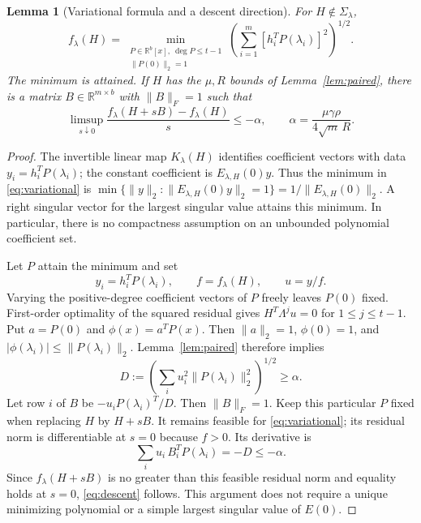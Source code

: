 \documentclass[11pt]{article}
\numberwithin{equation}{section}
\newtheorem{lemma}[theorem]{Lemma}
\theoremstyle{definition}
\newcommand{\R}{\mathbb R}
\newcommand{\nn}[1]{\lVert #1\rVert}
\begin{document}
\begin{lemma}[Variational formula and a descent direction]\label{lem:descent}
For $H\notin\Sigma_\lambda$,
\begin{equation}\label{eq:variational}
f_\lambda(H)=
\min_{\substack{P\in\R^b[x],\ \deg P\le t-1\\\nn{P(0)}_2=1}}
\left(\sum_{i=1}^m[h_i^TP(\lambda_i)]^2\right)^{1/2}.
\end{equation}
The minimum is attained. If $H$ has the $\mu,R$ bounds of Lemma~\ref{lem:paired}, there is a matrix $B\in\R^{m\times b}$ with $\nn B_F=1$ such that
\begin{equation}\label{eq:descent}
\limsup_{s\downarrow0}\frac{f_\lambda(H+sB)-f_\lambda(H)}s\le-\alpha,
\qquad\alpha=\frac{\mu\gamma\rho}{4\sqrt m\,R}.
\end{equation}
\end{lemma}
\begin{proof}
The invertible linear map $K_\lambda(H)$ identifies coefficient vectors with data $y_i=h_i^TP(\lambda_i)$; the constant coefficient is $E_{\lambda,H}(0)y$. Thus the minimum in \eqref{eq:variational} is
$\min\{\nn y_2:\nn{E_{\lambda,H}(0)y}_2=1\}=1/\nn{E_{\lambda,H}(0)}_2$. A right singular vector for the largest singular value attains this minimum. In particular, there is no compactness assumption on an unbounded polynomial coefficient set.

Let $P$ attain the minimum and set
\[
y_i=h_i^TP(\lambda_i),\qquad f=f_\lambda(H),\qquad u=y/f.
\]
Varying the positive-degree coefficient vectors of $P$ freely leaves $P(0)$ fixed. First-order optimality of the squared residual gives
$H^T\Lambda^ju=0$ for $1\le j\le t-1$.
Put $a=P(0)$ and $\phi(x)=a^TP(x)$. Then $\nn a_2=1$, $\phi(0)=1$, and $|\phi(\lambda_i)|\le\nn{P(\lambda_i)}_2$.
Lemma~\ref{lem:paired} therefore implies
\begin{equation}\label{eq:W}
D:=\left(\sum_i u_i^2\nn{P(\lambda_i)}_2^2\right)^{1/2}\ge\alpha.
\end{equation}
Let row $i$ of $B$ be $-u_iP(\lambda_i)^T/D$. Then $\nn B_F=1$. Keep this particular $P$ fixed when replacing $H$ by $H+sB$. It remains feasible for \eqref{eq:variational}; its residual norm is differentiable at $s=0$ because $f>0$. Its derivative is
\[
\sum_i u_i\,B_i^TP(\lambda_i)=-D\le-\alpha.
\]
Since $f_\lambda(H+sB)$ is no greater than this feasible residual norm and equality holds at $s=0$, \eqref{eq:descent} follows.
This argument does not require a unique minimizing polynomial or a simple largest singular value of $E(0)$.
\end{proof}
\end{document}

